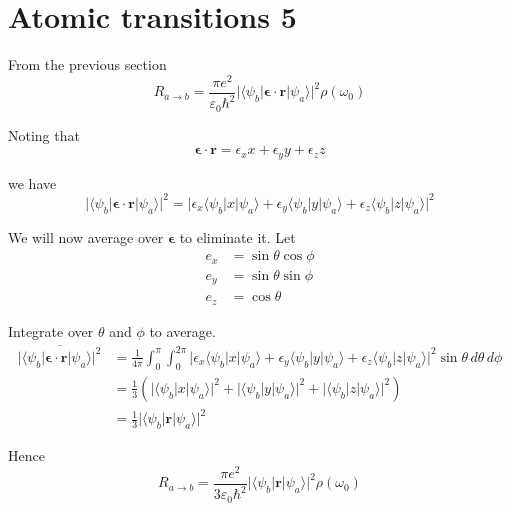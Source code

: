 

\section*{Atomic transitions 5}

From the previous section
\begin{equation*}
R_{a\rightarrow b}
=\frac{\pi e^2}{\varepsilon_0\hbar^2}
\bigl|\langle\psi_b|\boldsymbol{\epsilon}\cdot\mathbf r|\psi_a\rangle\bigr|^2
\rho(\omega_0)
\end{equation*}

Noting that
\begin{equation*}
\boldsymbol{\epsilon}\cdot\mathbf r=\epsilon_xx+\epsilon_yy+\epsilon_zz
\end{equation*}

we have
\begin{equation*}
\bigl|\langle\psi_b|\boldsymbol{\epsilon}\cdot\mathbf r|\psi_a\rangle\bigr|^2
=\bigl|
\epsilon_x\langle\psi_b|x|\psi_a\rangle
+\epsilon_y\langle\psi_b|y|\psi_a\rangle
+\epsilon_z\langle\psi_b|z|\psi_a\rangle
\bigr|^2
\end{equation*}

We will now average over $\boldsymbol\epsilon$ to eliminate it.
Let
\begin{align*}
e_x&=\sin\theta\cos\phi
\\
e_y&=\sin\theta\sin\phi
\\
e_z&=\cos\theta
\end{align*}

Integrate over $\theta$ and $\phi$ to average.
\begin{align*}
\overline{\bigl|\langle\psi_b|\boldsymbol{\epsilon}\cdot\mathbf r|\psi_a\rangle\bigr|^2}
&=\frac{1}{4\pi}\int_0^\pi\int_0^{2\pi}
\bigl|
\epsilon_x\langle\psi_b|x|\psi_a\rangle
+\epsilon_y\langle\psi_b|y|\psi_a\rangle
+\epsilon_z\langle\psi_b|z|\psi_a\rangle
\bigr|^2\sin\theta\,d\theta\,d\phi
\\
&=\frac{1}{3}\left(
\bigl|\langle\psi_b|x|\psi_a\rangle\bigr|^2
+\bigl|\langle\psi_b|y|\psi_a\rangle\bigr|^2
+\bigl|\langle\psi_b|z|\psi_a\rangle\bigr|^2
\right)
\\
&=\frac{1}{3}\bigl|\langle\psi_b|\mathbf r|\psi_a\rangle\bigr|^2
\tag{1}
\end{align*}

Hence
\begin{equation*}
R_{a\rightarrow b}
=\frac{\pi e^2}{3\varepsilon_0\hbar^2}
\bigl|\langle\psi_b|\mathbf r|\psi_a\rangle\bigr|^2
\rho(\omega_0)
\end{equation*}


